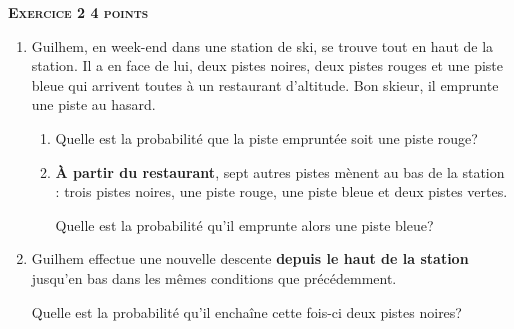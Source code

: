 \textbf{\textsc{Exercice 2 \hfill 4 points}}

\medskip

		\begin{enumerate}
			\item Guilhem, en week-end dans une station de ski, se trouve tout en haut de la station. Il a en face de lui, deux pistes noires, deux pistes rouges et une piste bleue qui arrivent toutes à un restaurant d'altitude. Bon skieur, il emprunte une piste au hasard.
			\begin{enumerate}
				\item Quelle est la probabilité que la piste empruntée soit une piste rouge?
				
				\item \textbf{À partir du restaurant}, sept autres pistes mènent au bas de la station : trois pistes noires, une piste rouge, une piste bleue et deux pistes vertes.
				
Quelle est la probabilité qu'il emprunte alors une piste bleue?
			\end{enumerate}
			
			\item Guilhem effectue une nouvelle descente \textbf{depuis le haut de la station} jusqu'en bas dans les mêmes conditions que précédemment.
			
Quelle est la probabilité qu'il enchaîne cette fois-ci deux pistes noires?
		\end{enumerate}

\vspace{0,5cm}

